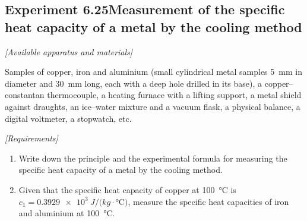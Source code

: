 \subsection*{Experiment 6.25\quad Measurement of the specific heat capacity of a metal by the cooling method}

\noindent\textit{[Available apparatus and materials]}

Samples of copper, iron and aluminium (small cylindrical metal samples \SI{5}{mm} in diameter and \SI{30}{mm} long, each with a deep hole drilled in its base), a copper--constantan thermocouple, a heating furnace with a lifting support, a metal shield against draughts, an ice--water mixture and a vacuum flask, a physical balance, a digital voltmeter, a stopwatch, etc.

\noindent\textit{[Requirements]}
\begin{enumerate}[label=(\arabic*),leftmargin=2.2em,itemsep=1pt,topsep=2pt]
\item Write down the principle and the experimental formula for measuring the specific heat capacity of a metal by the cooling method.
\item Given that the specific heat capacity of copper at \SI{100}{\celsius} is $c_1=\SI{0.3929e3}{J/(kg\cdot\celsius)}$, measure the specific heat capacities of iron and aluminium at \SI{100}{\celsius}.
\end{enumerate}

